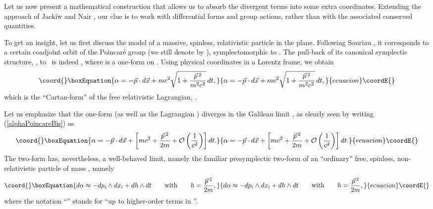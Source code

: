 \documentclass[a4paper,11pt]{article}
\providecommand{\cL}{{\cal L}}
\providecommand{\bR}{{\bf R}}
\providecommand{\vx}{{\vec x}}
\def\vp{{\vec p}}
\def\vv{{\vec v}}
\def\vx{{\vec x}}
\begin{document}

Let us now present a mathematical construction that allows us to absorb the
divergent terms into some extra coordinates. Extending the approach of
Jackiw and
Nair \cite{JaNa2}, our clue is to work with differential forms and group
actions,
rather than with the associated conserved quantities.

To get an insight, let us first discuss the model of a
massive, spinless, relativistic particle in the plane.
Following Souriau \cite{SSD}, it  corresponds to a certain coadjoint orbit
of the
Poincar\'e group (we still denote by \coordHE{}), symplectomorphic to
\myHighlight{$T^*\bR^2$}\coordHE{}. The pull-back of its canonical symplectic structure, \myHighlight{$\omega$}\coordHE{},
to~\coordHE{} is indeed \coordHE{}, where
\coordHE{} is a one-form on \coordHE{}.
Using physical coordinates in a Lorentz frame, we obtain
\begin{equation}\coord{}\boxEquation{
\alpha=-\vp\cdot d\vx+mc^2\sqrt{1+\frac{\vp{\,}^2}{m^2c^2}}\,dt,
\label{alphaPoincareBis}
}{
\alpha=-\vp\cdot d\vx+mc^2\sqrt{1+\frac{\vp{\,}^2}{m^2c^2}}\,dt,
}{ecuacion}\coordE{}\end{equation}
which is the ``Cartan-form'' \cite{SSD} of the free relativistic Lagrangian,
\myHighlight{$\cL_{0}=mc^2\sqrt{1-\vv{\,}^2/c^2}$}\coordHE{}.

\goodbreak

Let us emphasize that the one-form \myHighlight{$\alpha$}\coordHE{}
(as well as the Lagrangian \myHighlight{$\cL_{0}$}\coordHE{}) diverges
in the Galilean limit \coordHE{}, as clearly seen by writing
(\ref{alphaPoincareBis}) as
\begin{equation}\coord{}\boxEquation{
\alpha
=
-\vp\cdot d\vx
+\left[
mc^2
+
\frac{\vp{\,}^2}{2m}+\mathcal{O}\left(\frac{1}{c^2}\right)
\right]dt.
\label{alphaPoincareTer}
}{
\alpha
=
-\vp\cdot d\vx
+\left[
mc^2
+
\frac{\vp{\,}^2}{2m}+\mathcal{O}\left(\frac{1}{c^2}\right)
\right]dt.
}{ecuacion}\coordE{}\end{equation}
The two-form \coordHE{} has,
nevertheless, a well-behaved limit, namely the familiar presymplectic two-form
of an ``ordinary'' free, spinless, non-relativistic particle of mass
\coordHE{}, namely
\begin{equation}\coord{}\boxEquation{
d\alpha
\approx
-dp_i\wedge{}dx_i
+
dh\wedge{}dt
\qquad
\mathrm{with}
\qquad
h=\frac{\vp{\,}^2}{2m},
\label{limitdalphaPoincare}
}{
d\alpha
\approx
-dp_i\wedge{}dx_i
+
dh\wedge{}dt
\qquad
\mathrm{with}
\qquad
h=\frac{\vp{\,}^2}{2m},
}{ecuacion}\coordE{}\end{equation}
where the notation ``\myHighlight{$\approx$}\coordHE{}'' stands for ``up to higher-order terms in
\coordHE{}''.
\end{document}
